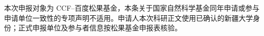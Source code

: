 \justifying
\NSFCBodyText

本次申报对象为 CCF--百度松果基金，本条关于国家自然科学基金同年申请或参与申请单位一致性的专项声明不适用。申请人本次科研正文使用已确认的新疆大学身份；正式申报单位及参与者信息按松果基金申报表核验。

